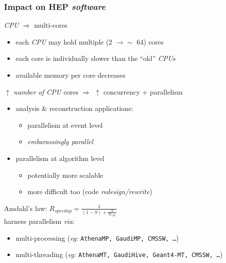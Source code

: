 \documentclass[9pt]{beamer}
\newcommand{\mypurple}[1]{{\color[rgb]{0.7,0,0.8}#1}}
\begin{document}
\begin{frame}
  \frametitle{Impact on HEP \emph{software}}

  \begin{block}{}
    \emph{CPU} $\Rightarrow$ multi-cores
    \begin{itemize}
    \item each \emph{CPU} may hold \alert{multiple} (2 $\rightarrow \sim$ 64) \alert{cores}
    \item each core is \alert{individually slower} than the ``old'' \emph{CPUs}
    \item available memory per core \alert{decreases}
    \end{itemize}
  \end{block}
  
  \begin{block}{}
   $\uparrow$ \emph{number of CPU} cores $\Rightarrow$ $\uparrow$ \alert{concurrency + parallelism}
    
    \begin{itemize}
    \item analysis \& reconstruction applications:
      \begin{itemize}
      \item parallelism at event level
      \item \emph{embarassingly parallel}
      \end{itemize}
    \item parallelism at algorithm level
      \begin{itemize}
      \item potentially more scalable
      \item more difficult too (code \emph{redesign/rewrite})
      \end{itemize}
    \end{itemize}
  \end{block}
  
  \begin{block}{}
   Amdahl's law: $R_{speedup} = \frac{1}{(1-S)+\frac{S}{N_{CPU}}}$
   \\
   harness parallelism \emph{via}:
    \begin{itemize}
    \item \mypurple{multi-processing} (\emph{eg:} \texttt{AthenaMP, GaudiMP, CMSSW, \ldots})
    \item \mypurple{multi-threading} (\emph{eg:} \texttt{AthenaMT, GaudiHive,
      Geant4-MT, CMSSW, \ldots})
    \end{itemize}
  \end{block}

\end{frame}
\end{document}
